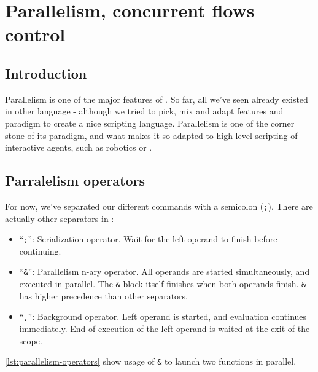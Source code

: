 \documentclass[openright,twoside,12pt]{report}
\newcommand{\lst}[1]{\autoref{lst:#1}}
\begin{document}

\chapter{Parallelism, concurrent flows control}

\section{Introduction}

Parallelism is one of the major features of \urbi. So far, all we've
seen already existed in other language - although we tried to pick,
mix and adapt features and paradigm to create a nice scripting
language. Parallelism is one of the corner stone of its paradigm, and
what makes it so adapted to high level scripting of interactive
agents, such as robotics or \ai.

\section{Parralelism operators}

For now, we've separated our different commands with a semicolon
(\texttt{;}). There are actually other separators in \urbi:

\begin{itemize}
\item ``\texttt{;}'': Serialization operator. Wait for the left
  operand to finish before continuing.
\item ``\texttt{\&}'': Parallelism n-ary operator. All operands are
  started simultaneously, and executed in parallel. The \texttt{\&}
  block itself finishes when both operands finish. \texttt{\&} has
  higher precedence than other separators.
\item ``\texttt{,}'': Background operator. Left operand is started,
  and evaluation continues immediately. End of execution of the left
  operand is waited at the exit of the scope.
\end{itemize}

\lst{parallelism-operators} show usage of \texttt{\&} to launch two
functions in parallel.
\end{document}
